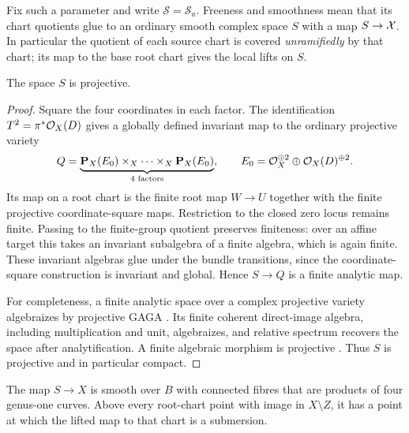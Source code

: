 Fix such a parameter and write $\mathcal S=\mathcal S_a$. Freeness and smoothness mean that its chart quotients glue to an ordinary smooth complex space $S$ with a map $S\to\mathcal X$. In particular the quotient of each source chart is covered \emph{unramifiedly} by that chart; its map to the base root chart gives the local lifts on $S$.

\begin{lemma}[Projectivity]\label{lem:projectivity}
The space $S$ is projective.
\end{lemma}

\begin{proof}
Square the four coordinates in each factor. The identification $T^2=\pi^*\mathcal O_X(D)$ gives a globally defined invariant map to the ordinary projective variety
\begin{equation}\label{eq:square-target}
 Q=\underbrace{\mathbf P_X(E_0)\times_X\cdots\times_X\mathbf P_X(E_0)}_{4\text{ factors}},
 \qquad E_0=\mathcal O_X^{\oplus2}\oplus\mathcal O_X(D)^{\oplus2}.
\end{equation}
Its map on a root chart is the finite root map $W\to U$ together with the finite projective coordinate-square maps. Restriction to the closed zero locus remains finite. Passing to the finite-group quotient preserves finiteness: over an affine target this takes an invariant subalgebra of a finite algebra, which is again finite. These invariant algebras glue under the bundle transitions, since the coordinate-square construction is invariant and global. Hence $S\to Q$ is a finite analytic map.

For completeness, a finite analytic space over a complex projective variety algebraizes by projective GAGA \cite{GAGA}. Its finite coherent direct-image algebra, including multiplication and unit, algebraizes, and relative spectrum recovers the space after analytification. A finite algebraic morphism is projective \cite[Tag~01WG]{Stacks}. Thus $S$ is projective and in particular compact.
\end{proof}

\begin{lemma}\label{lem:fibres-witnesses}
The map $S\to X$ is smooth over $B$ with connected fibres that are products of four genus-one curves. Above every root-chart point with image in $X\setminus Z$, it has a point at which the lifted map to that chart is a submersion.
\end{lemma}

